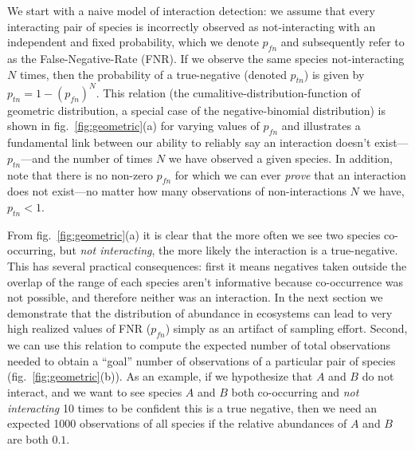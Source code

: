 \documentclass[10pt,oneside]{article}
\begin{document}
We start with a naive model of interaction detection: we assume that
every interacting pair of species is incorrectly observed as
not-interacting with an independent and fixed probability, which we
denote \(p_{fn}\) and subsequently refer to as the False-Negative-Rate
(FNR). If we observe the same species not-interacting \(N\) times, then
the probability of a true-negative (denoted \(p_{tn}\)) is given by
\(p_{tn}=1-(p_{fn})^N\). This relation (the
cumalitive-distribution-function of geometric distribution, a special
case of the negative-binomial distribution) is shown in
fig.~\ref{fig:geometric}(a) for varying values of \(p_{fn}\) and
illustrates a fundamental link between our ability to reliably say an
interaction doesn't exist---\(p_{tn}\)---and the number of times \(N\)
we have observed a given species. In addition, note that there is no
non-zero \(p_{fn}\) for which we can ever \emph{prove} that an
interaction does not exist---no matter how many observations of
non-interactions \(N\) we have, \(p_{tn}<1\).

From fig.~\ref{fig:geometric}(a) it is clear that the more often we see
two species co-occurring, but \emph{not interacting}, the more likely
the interaction is a true-negative. This has several practical
consequences: first it means negatives taken outside the overlap of the
range of each species aren't informative because co-occurrence was not
possible, and therefore neither was an interaction. In the next section
we demonstrate that the distribution of abundance in ecosystems can lead
to very high realized values of FNR (\(p_{fn}\)) simply as an artifact
of sampling effort. Second, we can use this relation to compute the
expected number of total observations needed to obtain a ``goal'' number
of observations of a particular pair of species
(fig.~\ref{fig:geometric}(b)). As an example, if we hypothesize that
\(A\) and \(B\) do not interact, and we want to see species \(A\) and
\(B\) both co-occurring and \emph{not interacting} 10 times to be
confident this is a true negative, then we need an expected 1000
observations of all species if the relative abundances of \(A\) and
\(B\) are both \(0.1\).
\end{document}
